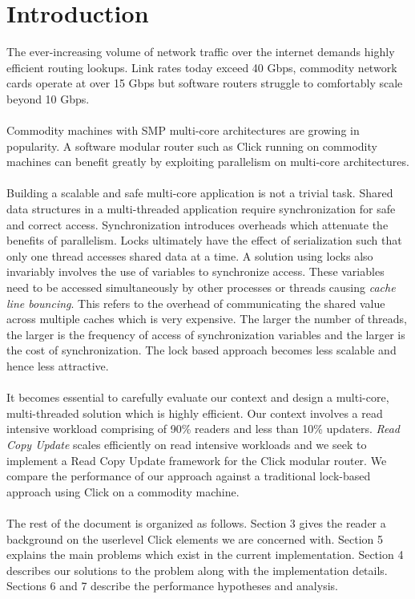 \documentclass{article}
\begin{document}
\section{Introduction}
The ever-increasing volume of network traffic over the internet demands highly efficient routing lookups. Link rates today exceed 40 Gbps, commodity network cards operate at over 15 Gbps but software routers struggle to comfortably scale beyond 10 Gbps. 
\\\\ Commodity machines with SMP multi-core architectures are growing in popularity. A software modular router such as Click running on commodity machines  can benefit greatly by exploiting parallelism on multi-core architectures.
\\\\ Building a scalable and safe multi-core application is not a trivial task. Shared data structures in a multi-threaded application require synchronization for safe and correct access. Synchronization introduces overheads which attenuate the benefits of parallelism. Locks ultimately have the effect of  serialization such that only one thread accesses shared data at a time. A solution using locks also invariably involves the use of variables to synchronize access. These variables need to be accessed simultaneously by other processes or threads causing \emph{cache line bouncing}. This refers to the overhead of communicating the shared value across multiple caches which is very expensive. The larger the number of threads, the larger is the frequency of access of synchronization variables and the larger is the cost of synchronization. The lock based approach becomes less scalable and hence less attractive. 
\\\\ It becomes essential to carefully evaluate our context and design a multi-core, multi-threaded solution which is highly efficient. Our context involves a read intensive workload comprising of 90\% readers and less than 10\% updaters. \emph{Read Copy Update} \cite{readcopyupdate} scales efficiently on read intensive workloads and we seek to implement a Read Copy Update framework for the Click modular router. We compare the performance of our approach against a traditional lock-based approach using Click on a commodity machine. 
\\\\ The rest of the document is organized as follows. Section 3 gives the reader a background on the userlevel Click elements we are concerned with. Section 5 explains the main problems which exist in the current implementation. Section 4 describes our solutions to the problem along with the implementation details. Sections 6 and 7 describe the performance hypotheses and analysis.
\end{document}
